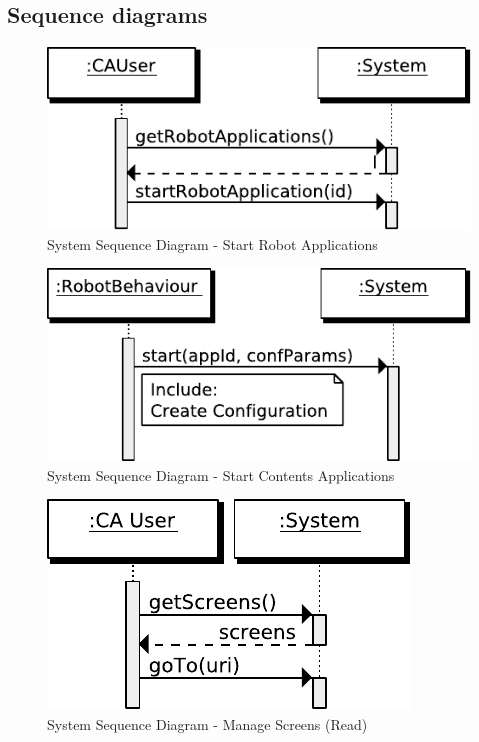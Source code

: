\subsection{Sequence diagrams}
\begin{figure}[htb]
    \centering
    \includegraphics{figures/spec-seq-start-qtapp.pdf}
    \caption{System Sequence Diagram - Start Robot Applications}
    \label{fig:spec-start-qtapp}
\end{figure}

\begin{figure}[htb]
    \centering
    \includegraphics{figures/spec-seq-start-contents-app.pdf}
    \caption{System Sequence Diagram - Start Contents Applications}
    \label{fig:spec-start-ca}
\end{figure}

\begin{figure}[htb]
    \centering
    \includegraphics{figures/spec-seq-manage-screens-read.pdf}
    \caption{System Sequence Diagram - Manage Screens (Read)}
    \label{fig:spec-manage-screens-read}
\end{figure}

